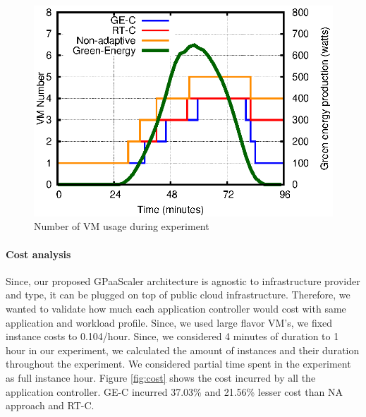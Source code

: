 \begin{figure} [htb]
\centering
\includegraphics[scale=.8]{Graphs/vm.eps}
\caption{Number of VM usage during experiment}
\label{fig:vm}
\end{figure}



\paragraph{\textbf{Cost analysis}}

Since, our proposed GPaaScaler architecture is agnostic to infrastructure provider and type, it can be plugged on top of public cloud infrastructure. Therefore, we wanted to validate how much each application controller would cost with same application and workload profile. Since, we used large flavor VM's, we fixed instance costs to 0.104\textdollar/hour. Since, we considered 4 minutes of duration to 1 hour in our experiment, we calculated the amount of instances and their duration throughout the experiment. We considered partial time spent in the experiment as full instance hour. Figure \ref{fig:cost} shows the cost incurred by all the application controller. GE-C incurred 37.03\% and 21.56\% lesser cost than NA approach and RT-C.

